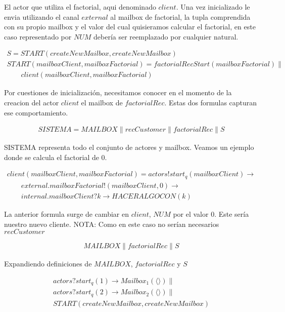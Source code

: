 \documentclass[fleqn]{article}
\newcommand{\myList}[1]{\langle #1 \rangle}
\begin{document}
El actor que utiliza el factorial, aqui denominado $client$. Una vez inicializado le envia utilizando el canal $external$ al mailbox de factorial, la tupla comprendida con su propio mailbox y el valor del cual quisieramos calcular el factorial, en este caso representado por $NUM$ debería ser reemplazado por cualquier natural. 

\begin{gather*}
S = START(createNewMailbox, createNewMailbox) \\
START(mailboxClient, mailboxFactorial) = factorialRecStart(mailboxFactorial) \parallel \\
\qquad client(mailboxClient, mailboxFactorial) 
\end{gather*}

Por cuestiones de inicialización, necesitamos conocer en el momento de la creacion del actor $client$ el mailbox de $factorialRec$. Estas dos formulas capturan ese comportamiento.

\begin{gather*}
SISTEMA = MAILBOX \parallel recCustomer \parallel factorialRec \parallel S
\end{gather*}

SISTEMA representa todo el conjunto de actores y mailbox. Veamos un ejemplo donde se calcula el factorial de 0.

\begin{gather*}
client(mailboxClient, mailboxFactorial) =  actors!start_q(mailboxClient) \rightarrow  \\
\qquad external.mailboxFactorial!(mailboxClient,0) \rightarrow \\
\qquad internal.mailboxClient?k \rightarrow HACERALGOCON(k) 
\end{gather*}

La anterior formula surge de cambiar en $client$, $NUM$ por el valor 0. Este sería nuestro nuevo cliente. NOTA: Como en este caso no serían necesarios $recCustomer$ 

\begin{gather*}
MAILBOX \parallel factorialRec \parallel S
\end{gather*}

Expandiendo definiciones de $MAILBOX$, $factorialRec$ y $S$

\begin{gather*}
actors?start_q(1) \rightarrow Mailbox_1(\myList{})  \parallel \\
actors?start_q(2) \rightarrow Mailbox_2(\myList{})  \parallel \\
START(createNewMailbox, createNewMailbox) 
\end{gather*}
\end{document}
